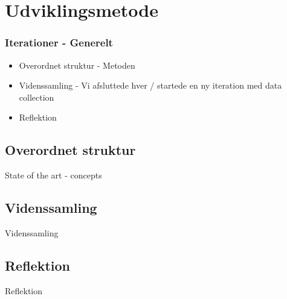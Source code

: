 \section{Udviklingsmetode}
\begin{frame}
  \frametitle{Iterationer - Generelt}
  \begin{itemize}
    \item Overordnet struktur - Metoden
    \item Videnssamling - Vi afsluttede hver / startede en ny iteration med data collection
    \item Reflektion
  \end{itemize}
\end{frame}

\subsection{Overordnet struktur}
\begin{frame}{State of the art - concepts}
\end{frame}
\subsection{Videnssamling}
\begin{frame}{Videnssamling}
\end{frame}
\subsection{Reflektion}
\begin{frame}{Reflektion}
\end{frame}
